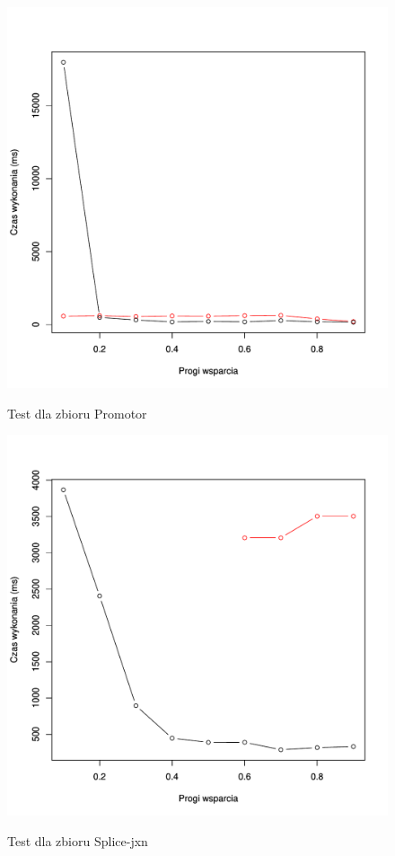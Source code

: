 \begin{figure}
\caption{Test dla zbioru Promotor}
\includegraphics[scale=0.7]{plots/Promotor.pdf}
\label{plot:promotor}
\end{figure}

\begin{figure}
\caption{Test dla zbioru Splice-jxn}
\includegraphics[scale=0.7]{plots/Slice.pdf}
\label{plot:slice}
\end{figure}


